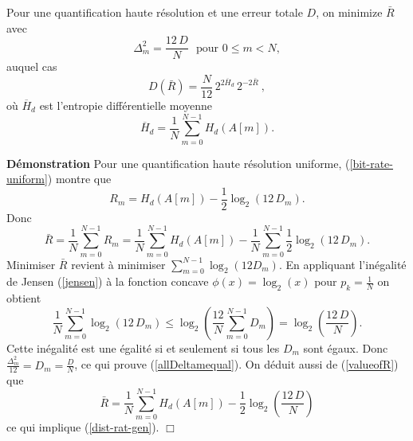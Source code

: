 \begin{theorem}
\label{bit-alloc-th}
Pour une quantification haute r\'esolution et une erreur
totale $D$, on minimize $\bar R$ avec
\begin{equation}
\label{allDeltamequal}
\Delta_m^2 = \frac {12\, D} N~~~\mbox{pour $0 \leq m < N$},
\end{equation}
auquel cas
\begin{equation}
\label{dist-rat-gen}
D(\bar R) = \frac N {12} \, 2^{2 \overline H_d} \, 2^{-2 \bar R} ~,
\end{equation}
o\`u $\overline H_d$ est l'entropie diff\'erentielle moyenne
\[
\overline H_d = \frac 1 N \sum_{m=0}^{N-1} H_d (A[m]) .
\]
\end{theorem}

{\bf D\'emonstration} Pour une quantification haute r\'esolution
uniforme, (\ref{bit-rate-uniform}) montre que
\[
R_m = H_d (A[m]) -  \frac 1 2 \log_2 (12 \, D_m ).
\]
Donc
\begin{equation}
\label{valueofR}
\bar R = \frac 1 N \sum_{m=0}^{N-1} R_m =
\frac 1 N \sum_{m=0}^{N-1}  H_d (A[m]) -
\frac 1 N \sum_{m=0}^{N-1}  \frac 1 2 \log_2 (12 \, D_m ).
\end{equation}
Minimiser $\bar R$ revient \`a minimiser
$\sum_{m=0}^{N-1}  \log_2 (12 D_m )$.
En appliquant l'in\'egalit\'e de Jensen (\ref{jensen}) \`a
la fonction concave $\phi(x) = \log_2 (x)$ pour $p_k = \frac 1 N$
on obtient
\[
\frac 1 N \sum_{m=0}^{N-1} \log_2 (12 \, D_m ) \leq
\log_2 \left(\frac {12} N \sum_{m=0}^{N-1} D_m \right) =
\log_2 \left(\frac {12 \, D} N \right)  .
\]
Cette in\'egalit\'e est une \'egalit\'e si et seulement si tous
les $D_m$ sont \'egaux.
Donc $\frac {\Delta_m^2} {12} = D_m = \frac D N$, ce qui
prouve (\ref{allDeltamequal}). On d\'eduit aussi de
(\ref{valueofR}) que
\[
\bar R = \frac 1 N \sum_{m=0}^{N-1}  H_d (A[m]) -
\frac 1 2 \log_2 \left(\frac {12\, D} N \right)
\]
ce qui implique (\ref{dist-rat-gen}). $\Box$

